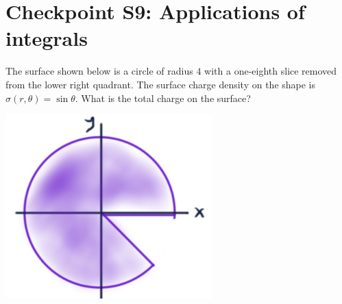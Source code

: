 


%


\allowdisplaybreaks
\section{Checkpoint S9: Applications of integrals}
The surface shown below is a circle of radius $4$ with a one-eighth slice removed from the lower right quadrant. The surface charge density on the shape is $\sigma(r,\theta) = \sin \theta$. What is the total charge on the surface?

\includegraphics[width=0.6\textwidth]{../images/pacman-charge.png}

	
